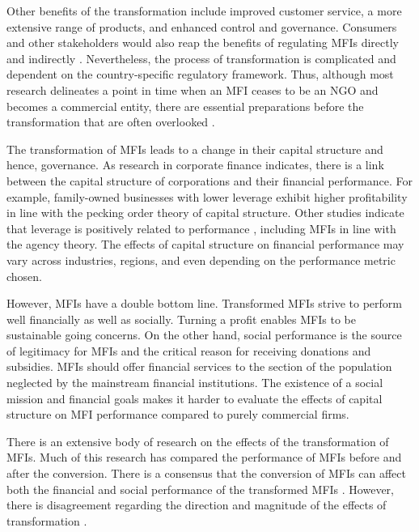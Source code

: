 \documentclass[a4paper, nobind]{templates/ociamthesis}
\begin{document}
Other benefits of the transformation include improved customer service, a more extensive range of products, and enhanced control and governance\autocite{srnec2008transformation}. Consumers and other stakeholders would also reap the benefits of regulating MFIs directly \autocite{meagher2006microfinance} and indirectly \autocite{hartarska2007regulated}. Nevertheless, the process of transformation is complicated and dependent on the country-specific regulatory framework. Thus, although most research delineates a point in time when an MFI ceases to be an NGO and becomes a commercial entity, there are essential preparations before the transformation that are often overlooked \autocite{d2017ngos}.

The transformation of MFIs leads to a change in their capital structure and hence, governance. As research in corporate finance indicates, there is a link between the capital structure of corporations and their financial performance. For example, family-owned businesses with lower leverage exhibit higher profitability \autocite{hamid2015capital} in line with the pecking order theory of capital structure. Other studies indicate that leverage is positively related to performance \autocite{fosu2013capital,berger2006capital}, including MFIs \autocite{kar2012does} in line with the agency theory. The effects of capital structure on financial performance may vary across industries, regions, and even depending on the performance metric chosen.

However, MFIs have a double bottom line. Transformed MFIs strive to perform well financially as well as socially. Turning a profit enables MFIs to be sustainable going concerns. On the other hand, social performance is the source of legitimacy for MFIs and the critical reason for receiving donations and subsidies. MFIs should offer financial services to the section of the population neglected by the mainstream financial institutions. The existence of a social mission and financial goals makes it harder to evaluate the effects of capital structure on MFI performance compared to purely commercial firms.

There is an extensive body of research on the effects of the transformation of MFIs. Much of this research has compared the performance of MFIs before and after the conversion. There is a consensus that the conversion of MFIs can affect both the financial and social performance of the transformed MFIs \autocite{chahine2010social,mersland2010microfinance}. However, there is disagreement regarding the direction and magnitude of the effects of transformation \autocite{mersland2010microfinance,d2017ngos}.
\end{document}
